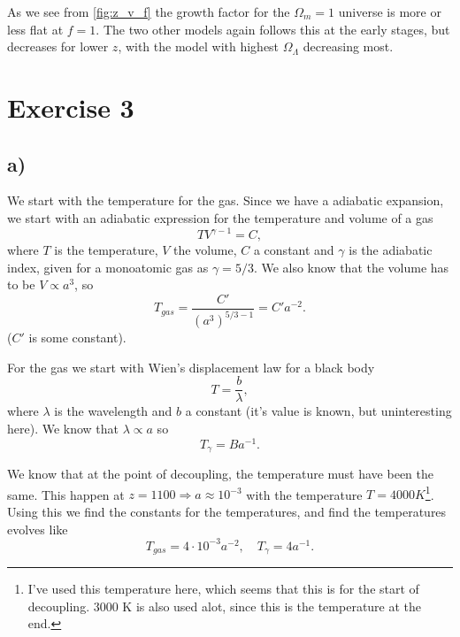 \documentclass[a4paper,norsk, 10pt]{article}
\begin{document}
As we see from \ref{fig:z_v_f} the growth factor for the $\Omega_{m} = 1$ universe is more or less flat at $f = 1$. The two other models again follows this at the early stages, but decreases for lower $z$, with the model with highest $\Omega_{\Lambda}$ decreasing most.

\section{Exercise 3}
\subsection{a)}
We start with the temperature for the gas. Since we have a adiabatic expansion, we start with an adiabatic expression for the temperature and volume of a gas
\begin{equation}
TV^{\gamma - 1} = C,
\end{equation}
where $T$ is the temperature, $V$ the volume, $C$ a constant and $\gamma$ is the adiabatic index, given for a monoatomic gas as $\gamma = 5/3$. We also know that the volume has to be $V \propto a^{3}$, so
\begin{equation}
T_{gas} = \frac{C'}{(a^3)^{5/3 - 1}} = C'a^{-2}.
\end{equation}
($C'$ is some constant). 

For the gas we start with Wien's displacement law for a black body
\begin{equation}
T = \frac{b}{\lambda},
\end{equation}
where $\lambda$ is the wavelength and $b$ a constant (it's value is known, but uninteresting here). We know that $\lambda \propto a$ so
\begin{equation}
T_{\gamma} = Ba^{-1}.
\end{equation}

We know that at the point of decoupling, the temperature must have been the same. This happen at $z = 1100 \Rightarrow a \approx 10^{-3}$ with the temperature $T = 4000K$\footnote{I've used this temperature here, which seems that this is for the start of decoupling. $3000$ K is also used alot, since this is the temperature at the end.}. Using this we find the constants for the temperatures, and find the temperatures evolves like
\begin{equation}
T_{gas} = 4\cdot 10^{-3}a^{-2}, \quad T_{\gamma} = 4a^{-1}.
\end{equation}
\end{document}
